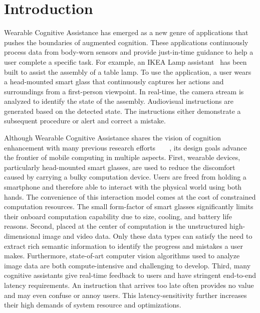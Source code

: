 \section{Introduction}

Wearable Cognitive Assistance has emerged as a new genre of applications that
pushes the boundaries of augmented cognition. These applications continuously
process data from body-worn sensors and provide just-in-time guidance to help a
user complete a specific task. For example, an IKEA Lamp
assistant~\cite{chen2018application} has been built to assist the assembly of a
table lamp. To use the application, a user wears a head-mounted smart glass that
continuously captures her actions and surroundings from a first-person
viewpoint. In real-time, the camera stream is analyzed to identify the state of
the assembly. Audiovisual instructions are generated based on the detected
state. The instructions either demonstrate a subsequent procedure or alert and
correct a mistake.

Although Wearable Cognitive Assistance shares the vision of cognition
enhancement with many previous research
efforts~\cite{kidd1999aware}~\cite{loomis1998navigation}~\cite{cheverst2000developing}~\cite{tanuwidjaja2014chroma},
its design goals advance the frontier of mobile computing in multiple aspects.
First, wearable devices, particularly head-mounted smart glasses, are used to
reduce the discomfort caused by carrying a bulky computation device. Users are
freed from holding a smartphone and therefore able to interact with the physical
world using both hands. The convenience of this interaction model comes at the
cost of constrained computation resources. The small form-factor of smart
glasses significantly limits their onboard computation capability due to size,
cooling, and battery life reasons. Second, placed at the center of computation
is the unstructured high-dimensional image and video data. Only these data types
can satisfy the need to extract rich semantic information to identify
the progress and mistakes a user makes. Furthermore, state-of-art computer vision
algorithms used to analyze image data are both compute-intensive and challenging
to develop. Third, many cognitive assistants give real-time feedback to users
and have stringent end-to-end latency requirements. An instruction that arrives
too late often provides no value and may even confuse or annoy users. This
latency-sensitivity further increases their high demands of system resource and
optimizations.

